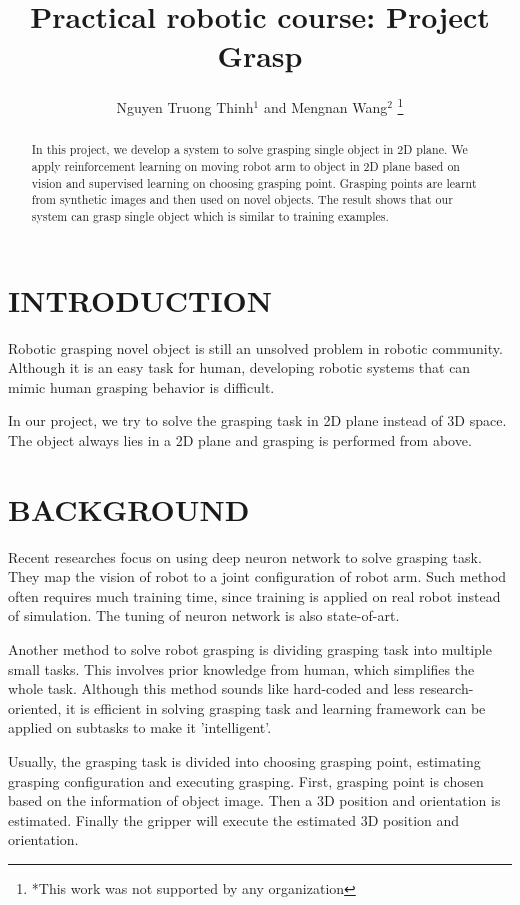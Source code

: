 \documentclass[a4paper, 10pt, conference]{ieeeconf}      %
\title{\LARGE \bf
Practical robotic course: Project Grasp
}
\author{Nguyen Truong Thinh$^{1}$ and Mengnan Wang$^{2}$%
\thanks{*This work was not supported by any organization}%
}
\begin{document}
\maketitle
\thispagestyle{empty}
\pagestyle{empty}


\begin{abstract}
In this project, we develop a system to solve grasping single object in 2D plane. We apply reinforcement learning on moving robot arm to object in 2D plane based on vision and supervised learning on choosing grasping point. Grasping points are learnt from synthetic images and then used on novel objects. The result shows that our system can grasp single object which is similar to training examples.   

\end{abstract}


\section{INTRODUCTION}
Robotic grasping novel object is still an unsolved problem in robotic community. Although it is an easy task for human, developing robotic systems that can mimic human grasping behavior is difficult.

In our project, we try to solve the grasping task in 2D plane instead of 3D space. The object always lies in a 2D plane and grasping is performed from above.
\section{BACKGROUND}
Recent researches focus on using deep neuron network to solve grasping task. They map the vision of robot to a joint configuration of robot arm. Such method often requires much training time, since training is applied on real robot instead of simulation\cite{c1}. The tuning of neuron network is also state-of-art.

Another method to solve robot grasping is dividing grasping task into multiple small tasks. This involves prior knowledge from human, which simplifies the whole task. Although this method sounds like hard-coded and less research-oriented, it is efficient in solving grasping task and learning framework can be applied on subtasks to make it 'intelligent'.

Usually, the grasping task is divided into choosing grasping point, estimating grasping configuration and executing grasping. First, grasping point is chosen based on the information of object image. Then a 3D position and orientation is estimated. Finally the gripper will execute the estimated 3D position and orientation.
\end{document}
